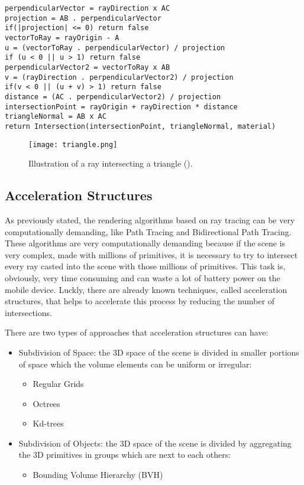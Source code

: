 \begin{lstlisting}[caption={Algorithm of Ray triangle intersection (\cite{LightHouseRayTriangle})}, captionpos=b, label=Triangle]
perpendicularVector = rayDirection x AC
projection = AB . perpendicularVector
if(|projection| <= 0) return false
vectorToRay = rayOrigin - A
u = (vectorToRay . perpendicularVector) / projection
if (u < 0 || u > 1) return false
perpendicularVector2 = vectorToRay x AB
v = (rayDirection . perpendicularVector2) / projection
if(v < 0 || (u + v) > 1) return false
distance = (AC . perpendicularVector2) / projection
intersectionPoint = rayOrigin + rayDirection * distance
triangleNormal = AB x AC
return Intersection(intersectionPoint, triangleNormal, material)
\end{lstlisting}

\begin{figure}[H]
	\centering
	\caption{Illustration of a ray intersecting a triangle (\cite{TriangleRayIntersection}).}
	\label{Sphere.}
	\texttt{[image: triangle.png]}
\end{figure}

\subsection{Acceleration Structures}

\par
As previously stated, the rendering algorithms based on ray tracing can be very computationally demanding, like Path Tracing and Bidirectional Path Tracing.
These algorithms are very computationally demanding because if the scene is very complex, made with millions of primitives, it is necessary to try to intersect every ray casted into the scene with those millions of primitives.
This task is, obviously, very time consuming and can waste a lot of battery power on the mobile device.
Luckly, there are already known techniques, called acceleration structures, that helps to accelerate this process by reducing the number of intersections.

\par
There are two types of approaches that acceleration structures can have:

\begin{itemize}
	\item Subdivision of Space: the 3D space of the scene is divided in smaller portions of space which the volume elements can be uniform or irregular:
	\begin{itemize}
		\item Regular Grids
		\item Octrees
		\item Kd-trees
	\end{itemize}
	\item Subdivision of Objects: the 3D space of the scene is divided by aggregating the 3D primitives in groups which are next to each others:
	\begin{itemize}
		\item Bounding Volume Hierarchy (BVH)
	\end{itemize}
\end{itemize}

